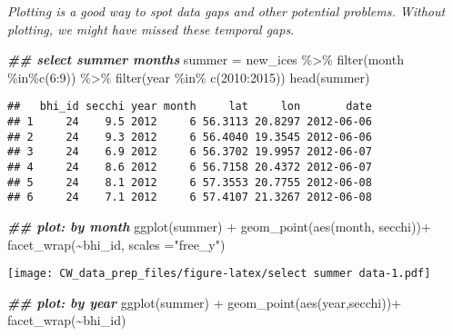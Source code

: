 \documentclass[
]{article}
\newenvironment{Shaded}{\begin{snugshade}}{\end{snugshade}}
\newcommand{\AttributeTok}[1]{\textcolor[rgb]{0.77,0.63,0.00}{#1}}
\newcommand{\DecValTok}[1]{\textcolor[rgb]{0.00,0.00,0.81}{#1}}
\newcommand{\DocumentationTok}[1]{\textcolor[rgb]{0.56,0.35,0.01}{\textbf{\textit{#1}}}}
\newcommand{\FunctionTok}[1]{\textcolor[rgb]{0.00,0.00,0.00}{#1}}
\newcommand{\NormalTok}[1]{#1}
\newcommand{\OtherTok}[1]{\textcolor[rgb]{0.56,0.35,0.01}{#1}}
\newcommand{\SpecialCharTok}[1]{\textcolor[rgb]{0.00,0.00,0.00}{#1}}
\newcommand{\StringTok}[1]{\textcolor[rgb]{0.31,0.60,0.02}{#1}}
\begin{document}
\emph{Plotting is a good way to spot data gaps and other potential
problems. Without plotting, we might have missed these temporal gaps.}

\begin{Shaded}
\begin{Highlighting}[]
\DocumentationTok{\#\# select summer months}
\NormalTok{summer }\OtherTok{=}\NormalTok{ new\_ices }\SpecialCharTok{\%\textgreater{}\%} \FunctionTok{filter}\NormalTok{(month }\SpecialCharTok{\%in\%}\FunctionTok{c}\NormalTok{(}\DecValTok{6}\SpecialCharTok{:}\DecValTok{9}\NormalTok{)) }\SpecialCharTok{\%\textgreater{}\%}
        \FunctionTok{filter}\NormalTok{(year }\SpecialCharTok{\%in\%} \FunctionTok{c}\NormalTok{(}\DecValTok{2010}\SpecialCharTok{:}\DecValTok{2015}\NormalTok{))}
\FunctionTok{head}\NormalTok{(summer)}
\end{Highlighting}
\end{Shaded}

\begin{verbatim}
##   bhi_id secchi year month     lat     lon       date
## 1     24    9.5 2012     6 56.3113 20.8297 2012-06-06
## 2     24    9.3 2012     6 56.4040 19.3545 2012-06-06
## 3     24    6.9 2012     6 56.3702 19.9957 2012-06-07
## 4     24    8.6 2012     6 56.7158 20.4372 2012-06-07
## 5     24    8.1 2012     6 57.3553 20.7755 2012-06-08
## 6     24    7.1 2012     6 57.4107 21.3267 2012-06-08
\end{verbatim}

\begin{Shaded}
\begin{Highlighting}[]
\DocumentationTok{\#\# plot: by month}
\FunctionTok{ggplot}\NormalTok{(summer) }\SpecialCharTok{+} \FunctionTok{geom\_point}\NormalTok{(}\FunctionTok{aes}\NormalTok{(month, secchi))}\SpecialCharTok{+}
  \FunctionTok{facet\_wrap}\NormalTok{(}\SpecialCharTok{\textasciitilde{}}\NormalTok{bhi\_id, }\AttributeTok{scales =}\StringTok{"free\_y"}\NormalTok{)}
\end{Highlighting}
\end{Shaded}

\texttt{[image: CW\_data\_prep\_files/figure-latex/select summer data-1.pdf]}

\begin{Shaded}
\begin{Highlighting}[]
\DocumentationTok{\#\# plot: by year}
\FunctionTok{ggplot}\NormalTok{(summer) }\SpecialCharTok{+} \FunctionTok{geom\_point}\NormalTok{(}\FunctionTok{aes}\NormalTok{(year,secchi))}\SpecialCharTok{+}
  \FunctionTok{facet\_wrap}\NormalTok{(}\SpecialCharTok{\textasciitilde{}}\NormalTok{bhi\_id)}
\end{Highlighting}
\end{Shaded}
\end{document}
